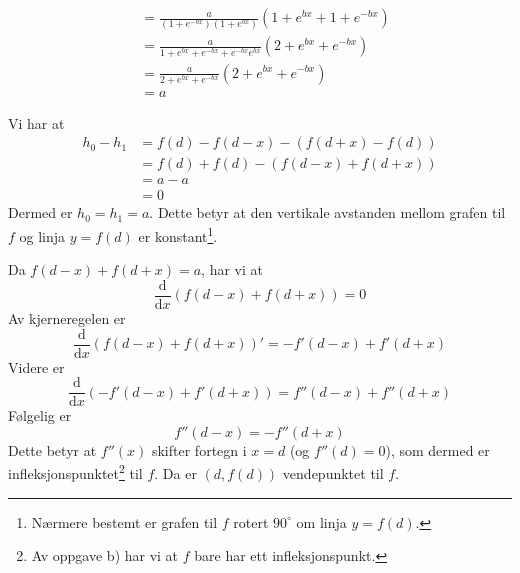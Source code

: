 {\begin{align*}
	&=\frac{a}{(1+e^{-bx})(1+e^{bx})}\left(1+e^{bx}+1+e^{-bx}\right) \\
	&=\frac{a}{1+e^{bx}+e^{-bx}+e^{-bx}e^{bx}}\left(2+e^{bx}+e^{-bx}\right) \\
	&=\frac{a}{2+e^{bx}+e^{-bx}}\left(2+e^{bx}+e^{-bx}\right)\\
	&=a
\end{align*}
\item Vi har at
\begin{align*}
	h_0-h_1 &=f(d)-f(d-x)-(f(d+x)-f(d)) \\
	&= f(d)+f(d)- (f(d-x)+f(d+x)) \\
	&= a-a \\
	&=0
\end{align*}
Dermed er $h_0=h_1=a$. Dette betyr at den vertikale avstanden mellom grafen til $f$ og linja $y=f(d)$ er konstant\footnote{Nærmere bestemt er grafen til $f$ rotert $90^\circ$ om linja $y=f(d)$.}.
\item Da $f(d-x)+f(d+x)=a$, har vi at
\[ \dfrac{\text{d}}{\text{d}x}\left(f(d-x)+f(d+x)\right)=0 \]
Av kjerneregelen er
\[ \dfrac{\text{d}}{\text{d}x}\left(f(d-x)+f(d+x)\right)'=-f'(d-x)+f'(d+x) \]
Videre er
\[ \frac{\text{d}}{\text{d}x}\left(-f'(d-x)+f'(d+x)\right)=f''(d-x)+f''(d+x) \]
Følgelig er
\[ f''(d-x)=-f''(d+x) \]
Dette betyr at $f''(x)$ skifter fortegn i $x=d$ (og $f''(d)=0$), som dermed er infleksjonspunktet\footnote{Av oppgave b) har vi at $f$ bare har ett infleksjonspunkt.} til $f$. Da er $(d, f(d))$ vendepunktet til $f$.
}



